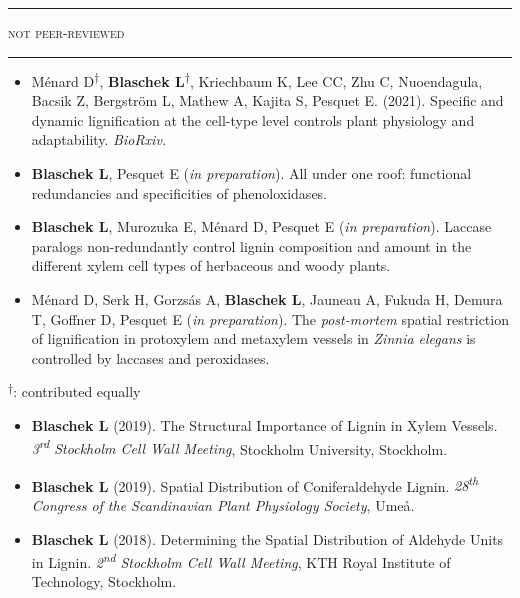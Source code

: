 \documentclass[11pt]{article}
\newcommand*{\xdash}[1][3em]{\rule[0.5ex]{#1}{0.55pt}}
\begin{document}
\hspace*{\fill} \xdash[6em] \large{\textsc{not peer-reviewed}} \xdash[6em] \hspace*{\fill}\normalsize

\begin{itemize}[label={},itemindent=-9pt,leftmargin=24pt]
	\itemsep-0.1cm
	\item Ménard D\textsuperscript{$\dagger$}, \textbf{Blaschek L}\textsuperscript{$\dagger$}, Kriechbaum K, Lee CC, Zhu C, Nuoendagula, Bacsik Z, Bergström L, Mathew A, Kajita S, Pesquet E. (2021). Specific and dynamic lignification at the cell-type level controls plant physiology and adaptability. \textit{BioRxiv.}
	\item \textbf{Blaschek L}, Pesquet E (\textit{in preparation}). All under one roof: functional redundancies and specificities of phenoloxidases.
	\item \textbf{Blaschek L}, Murozuka E, Ménard D, Pesquet E (\textit{in preparation}). Laccase paralogs non-redundantly control lignin composition and amount in the different xylem cell types of herbaceous and woody plants.
	\item Ménard D, Serk H, Gorzsás A, \textbf{Blaschek L}, Jauneau A, Fukuda H, Demura T, Goffner D, Pesquet E (\textit{in preparation}). The \textit{post-mortem} spatial restriction of lignification in protoxylem and metaxylem vessels in \textit{Zinnia elegans} is controlled by laccases and peroxidases.
\end{itemize}

\textsuperscript{$\dagger$}: contributed equally
\vspace{0.5cm}

\vspace{-0.175cm}
\begin{itemize}[label={},itemindent=-9pt,leftmargin=24pt]
	\itemsep-0.1cm
	\item \textbf{Blaschek L} (2019). The Structural Importance of Lignin in Xylem Vessels. \textit{3\textsuperscript{rd} Stockholm Cell Wall Meeting}, Stockholm University, Stockholm.
	\item \textbf{Blaschek L} (2019). Spatial Distribution of Coniferaldehyde Lignin. \textit{28\textsuperscript{th} Congress of the Scandinavian Plant Physiology Society}, Umeå.
	\item \textbf{Blaschek L} (2018). Determining the Spatial Distribution of Aldehyde Units in Lignin. \textit{2\textsuperscript{nd} Stockholm Cell Wall Meeting}, KTH Royal Institute of Technology, Stockholm.
\end{itemize}
\vspace{0.3cm}
\end{document}
